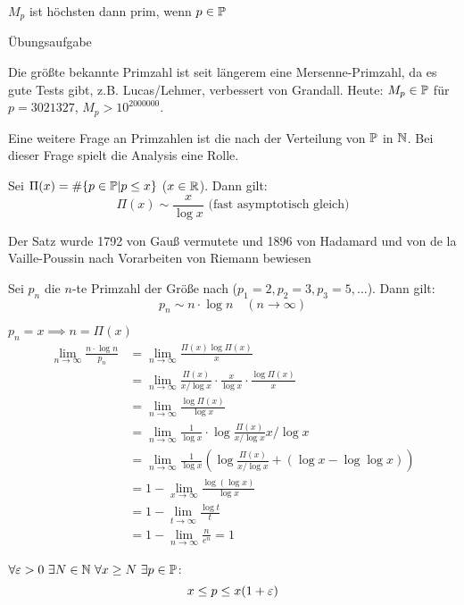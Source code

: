 \documentclass[a4paper,twoside,DIV15,BCOR12mm]{scrbook}
\begin{document}
\begin{satz}
$M_p$ ist höchsten dann prim, wenn $p\in\mathbb{P}$
\end{satz}
\begin{beweis}
Übungsaufgabe
\end{beweis}

Die größte bekannte Primzahl ist seit längerem eine
Mersenne-Primzahl, da es gute Tests gibt, z.B. Lucas/Lehmer,
verbessert von Grandall. Heute: $M_p\in\mathbb{P}$ für $p=3021327$,
$M_p>10^{2000000}$.

Eine weitere Frage an Primzahlen ist die nach der Verteilung von
$\mathbb{P}$ in $\mathbb{N}$. Bei dieser Frage spielt die Analysis eine Rolle.
\begin{satz}
Sei $\Pi(x) = \#\{p\in\mathbb{P}|p\le x\}$ ($x\in\mathbb{R}$). Dann gilt:
\[ \Pi(x) \sim \frac{x}{\log x} \text{ (fast asymptotisch gleich)} \]
\end{satz}
Der Satz wurde 1792 von Gauß vermutete und 1896 von Hadamard und von
de la Vaille-Poussin nach Vorarbeiten von Riemann bewiesen

\begin{folgerung}
Sei $p_n$ die $n$-te Primzahl der Größe nach ($p_1=2, p_2=3,
p_3=5,\ldots$). Dann gilt:
\[ p_n \sim n\cdot \log n \quad (n\to\infty) \]
\end{folgerung}
\begin{beweis}
$p_n = x \implies n=\Pi(x)$
\begin{align*}
\lim_{n\to\infty} \frac{n\cdot \log n}{p_n} &= \lim_{n\to\infty} \frac{\Pi(x) \log \Pi(x)}{x}\\
&= \lim_{n\to\infty} \frac{\Pi(x)}{x/\log x} \cdot \frac{x}{\log x} \cdot \frac{\log \Pi(x)}{x} \\
&= \lim_{n\to\infty} \frac {\log  \Pi(x)}{\log x}\\
&= \lim_{n\to\infty} \frac1{\log x} \cdot \log \frac{\Pi(x)}{x/\log x} x/\log x\\
&= \lim_{n\to\infty} \frac{1}{\log x} \left( \log \frac{\Pi(x)}{x/\log x} + (\log x - \log \log x) \right) \\
&= 1 - \lim_{x\to\infty} \frac{\log(\log x)}{\log x}\\
&= 1 - \lim_{t\to\infty} \frac{\log t}t\\
&= 1 - \lim_{n\to\infty}\frac n {e^n} = 1
\end{align*}
\end{beweis}

\begin{folgerung}
$\forall \ep > 0 \ \exists N\in\MdN \ \forall x\ge N \ \exists
p\in\MdP$:
\[ x \le p \le x(1+\varepsilon) \]
\end{folgerung}
\end{document}
